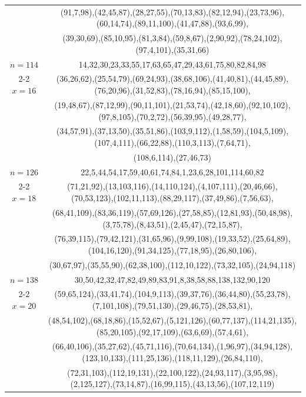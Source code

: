 \begin{tabular}{| c | c |}
&(91,7,98),(42,45,87),(28,27,55),(70,13,83),(82,12,94),(23,73,96),(60,14,74),(89,11,100),(41,47,88),(93,6,99),\\
&(39,30,69),(85,10,95),(81,3,84),(59,8,67),(2,90,92),(78,24,102),(97,4,101),(35,31,66)\\
\hline 
\(n=114\) & 
14,32,30,23,33,55,17,63,65,47,29,43,61,75,80,82,84,98\\
\cline{2-2}
\(x=16\)
&(36,26,62),(25,54,79),(69,24,93),(38,68,106),(41,40,81),(44,45,89),(76,20,96),(31,52,83),(78,16,94),(85,15,100),\\
&(19,48,67),(87,12,99),(90,11,101),(21,53,74),(42,18,60),(92,10,102),(97,8,105),(70,2,72),(56,39,95),(49,28,77),\\
&(34,57,91),(37,13,50),(35,51,86),(103,9,112),(1,58,59),(104,5,109),(107,4,111),(66,22,88),(110,3,113),(7,64,71),\\
&(108,6,114),(27,46,73)\\
\hline 
\(n=126\) & 
22,5,44,54,17,59,40,61,74,84,1,23,6,28,101,114,60,82\\
\cline{2-2}
\(x=18\)
&(71,21,92),(13,103,116),(14,110,124),(4,107,111),(20,46,66),(70,53,123),(102,11,113),(88,29,117),(37,49,86),(7,56,63),\\
&(68,41,109),(83,36,119),(57,69,126),(27,58,85),(12,81,93),(50,48,98),(3,75,78),(8,43,51),(2,45,47),(72,15,87),\\
&(76,39,115),(79,42,121),(31,65,96),(9,99,108),(19,33,52),(25,64,89),(104,16,120),(91,34,125),(77,18,95),(26,80,106),\\
&(30,67,97),(35,55,90),(62,38,100),(112,10,122),(73,32,105),(24,94,118)\\
\hline 
\(n=138\) & 
30,50,42,32,47,82,49,89,83,91,8,38,58,88,138,132,90,120\\
\cline{2-2}
\(x=20\)
&(59,65,124),(33,41,74),(104,9,113),(39,37,76),(36,44,80),(55,23,78),(7,101,108),(79,51,130),(29,46,75),(28,53,81),\\
&(48,54,102),(68,18,86),(15,52,67),(5,121,126),(60,77,137),(114,21,135),(85,20,105),(92,17,109),(63,6,69),(57,4,61),\\
&(66,40,106),(35,27,62),(45,71,116),(70,64,134),(1,96,97),(34,94,128),(123,10,133),(111,25,136),(118,11,129),(26,84,110),\\
&(72,31,103),(112,19,131),(22,100,122),(24,93,117),(3,95,98),(2,125,127),(73,14,87),(16,99,115),(43,13,56),(107,12,119)\\
\hline 
\end{tabular}